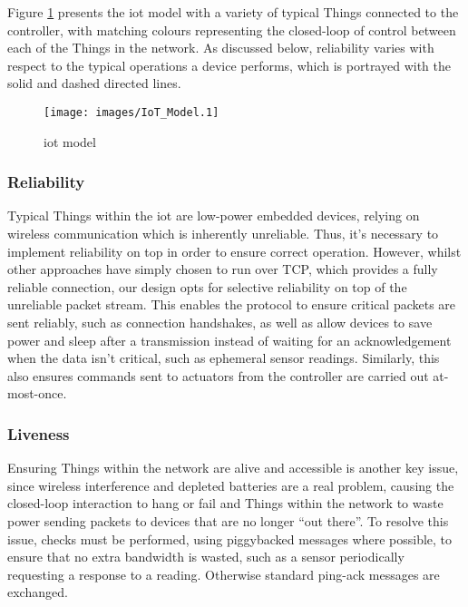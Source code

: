 \documentclass[conference]{./sty/IEEEtran}
\begin{document}
Figure \ref{fig:model} presents the iot model with a variety of typical Things connected to the controller, with matching colours representing the closed-loop of control between each of the Things in the network. As discussed below, reliability varies with respect to the typical operations a device performs, which is portrayed with the solid and dashed directed lines.

\begin{figure}[ht!]
\begin{center}
  \texttt{[image: images/IoT\_Model.1]}
\caption{iot model}
\label{fig:model}
\end{center}
\end{figure}

\subsubsection*{Reliability} %
\label{ssub:reliability}
Typical Things within the iot are low-power embedded devices, relying on wireless communication which is inherently unreliable. Thus, it's necessary to implement reliability on top in order to ensure correct operation. However, whilst other approaches have simply chosen to run over TCP, which provides a fully reliable connection, our design opts for selective reliability on top of the unreliable packet stream. This enables the protocol to ensure critical packets are sent reliably, such as connection handshakes, as well as allow devices to save power and sleep after a transmission instead of waiting for an acknowledgement when the data isn't critical, such as ephemeral sensor readings. Similarly, this also ensures commands sent to actuators from the controller are carried out at-most-once.

\subsubsection*{Liveness} %
\label{ssub:liveness}
Ensuring Things within the network are alive and accessible is another key issue, since wireless interference and depleted batteries are a real problem, causing the closed-loop interaction to hang or fail and Things within the network to waste power sending packets to devices that are no longer ``out there''. To resolve this issue, checks must be performed, using piggybacked messages where possible, to ensure that no extra bandwidth is wasted, such as a sensor periodically requesting a response to a reading. Otherwise standard ping-ack messages are exchanged.
\end{document}
